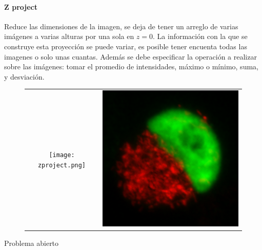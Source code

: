 \documentclass[addpoints,10pt]{exam}
\begin{document}
\begin{questions}
		\paragraph{Z project}
			Reduce las dimensiones de la imagen, se deja de tener un arreglo de varias im\'agenes a varias alturas por una sola en $z=0$. La informaci\'on con la que se construye esta proyecci\'on se puede variar, es posible tener encuenta todas las imagenes o solo unas cuantas. Adem\'as se debe especificar la operaci\'on a realizar sobre las im\'agenes: tomar el promedio de intensidades, m\'aximo o m\'inimo, suma, y desviaci\'on.
		
			\begin{figure}[h]
				\centering
				\begin{tabular}{cc}
					\texttt{[image: zproject.png]} & \includegraphics[width = 0.35\linewidth]{std.png}
				\end{tabular}
			\end{figure}
		{\question Problema abierto}
	\end{questions}
	
	
\end{document}
